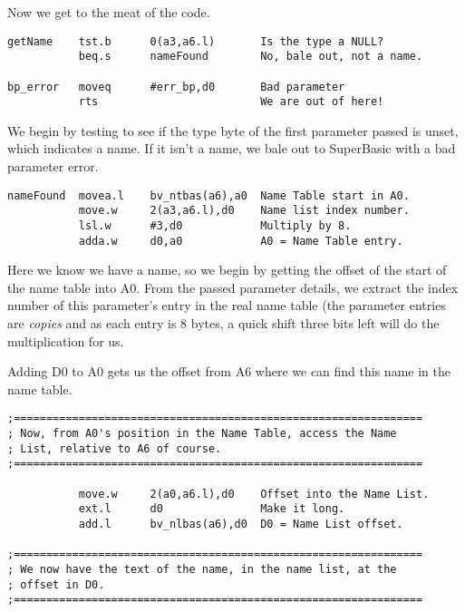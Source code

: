 Now we get to the meat of the code.

\begin{lstlisting}[firstnumber=last,caption={GetName - Checking Parameters}]
getName    tst.b      0(a3,a6.l)       Is the type a NULL?
           beq.s      nameFound        No, bale out, not a name.

bp_error   moveq      #err_bp,d0       Bad parameter
           rts                         We are out of here!
\end{lstlisting}

We begin by testing to see if the type byte of the first parameter passed is unset, which indicates a name. If it isn't a name, we bale out to SuperBasic with a bad parameter error.


\begin{lstlisting}[firstnumber=last,caption={GetName - We Have a Name}]
nameFound  movea.l    bv_ntbas(a6),a0  Name Table start in A0.
           move.w     2(a3,a6.l),d0    Name list index number.
           lsl.w      #3,d0            Multiply by 8.
           adda.w     d0,a0            A0 = Name Table entry.
\end{lstlisting}

Here we know we have a name, so we begin by getting the offset of the start of the name table into A0. From the passed parameter details, we extract the index number of this parameter's entry in the real name table (the parameter entries are \emph{copies}  and as each entry is 8 bytes, a quick shift three bits left will do the multiplication for us.

Adding D0 to A0 gets us the offset from A6 where we can find this name in the name table.


\begin{lstlisting}[firstnumber=last,caption={GetName - Find it in the Name List}]
;===============================================================
; Now, from A0's position in the Name Table, access the Name 
; List, relative to A6 of course.
;===============================================================

           move.w     2(a0,a6.l),d0    Offset into the Name List.
           ext.l      d0               Make it long.
           add.l      bv_nlbas(a6),d0  D0 = Name List offset.

;===============================================================
; We now have the text of the name, in the name list, at the 
; offset in D0.
;===============================================================
\end{lstlisting}

